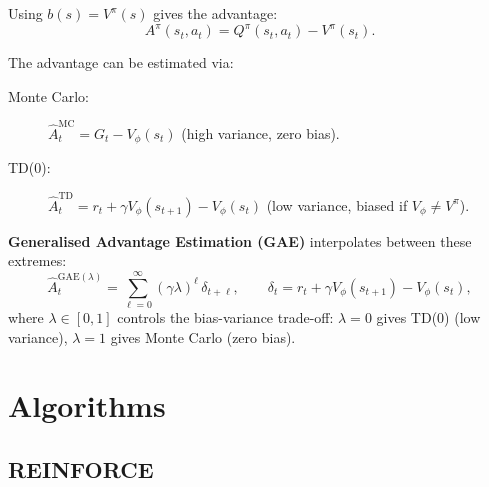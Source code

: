\documentclass[11pt, a4paper]{article}
\begin{document}
Using $b(s) = V^\pi(s)$ gives the advantage:
\begin{equation}
    A^\pi(s_t, a_t) = Q^\pi(s_t, a_t) - V^\pi(s_t).
\end{equation}

The advantage can be estimated via:
\begin{description}
    \item[Monte Carlo:] $\hat{A}_t^{\mathrm{MC}} = G_t - V_\phi(s_t)$
    (high variance, zero bias).
    \item[TD(0):] $\hat{A}_t^{\mathrm{TD}} = r_t + \gamma V_\phi(s_{t+1}) - V_\phi(s_t)$
    (low variance, biased if $V_\phi \neq V^\pi$).
\end{description}

\textbf{Generalised Advantage Estimation (GAE)} \citep{schulman2015} interpolates
between these extremes:
\begin{equation}
    \hat{A}_t^{\mathrm{GAE}(\lambda)} = \sum_{\ell=0}^{\infty} (\gamma\lambda)^\ell \, \delta_{t+\ell},
    \qquad \delta_t = r_t + \gamma V_\phi(s_{t+1}) - V_\phi(s_t),
    \label{eq:gae}
\end{equation}
where $\lambda \in [0,1]$ controls the bias-variance trade-off:
$\lambda = 0$ gives TD(0) (low variance), $\lambda = 1$ gives Monte Carlo (zero bias).

\section{Algorithms}
\label{sec:algorithms}

\subsection{REINFORCE}
\end{document}
